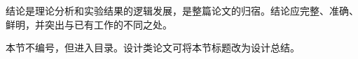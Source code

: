 
\begin{conclusion}
结论是理论分析和实验结果的逻辑发展，是整篇论文的归宿。结论应完整、准确、鲜明，并突出与已有工作的不同之处。

本节不编号，但进入目录。设计类论文可将本节标题改为设计总结。
\end{conclusion}
